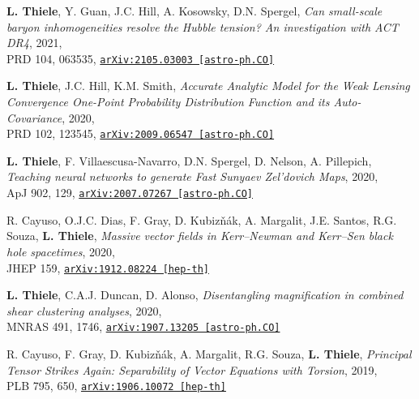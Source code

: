 \begin{minipage}{\textwidth}
{\bf L. Thiele}, Y. Guan, J.C. Hill, A. Kosowsky, D.N. Spergel,
\emph{Can small-scale baryon inhomogeneities resolve the Hubble tension? An investigation with ACT DR4}, 2021,\\
PRD 104, 063535,
\href{https://arxiv.org/abs/2105.03003}{\mbox{\texttt{arXiv:2105.03003 [astro-ph.CO]}}}
\end{minipage}

\begin{minipage}{\textwidth}
{\bf L. Thiele}, J.C. Hill, K.M. Smith,
\emph{Accurate Analytic Model for the Weak Lensing Convergence One-Point Probability Distribution Function and its Auto-Covariance}, 2020,\\
PRD 102, 123545,
\href{https://arxiv.org/abs/2009.06547}{\mbox{\texttt{arXiv:2009.06547 [astro-ph.CO]}}}
\end{minipage}

\begin{minipage}{\textwidth}
{\bf L. Thiele}, F. Villaescusa-Navarro, D.N. Spergel, D. Nelson, A. Pillepich,
\emph{Teaching neural networks to generate Fast Sunyaev Zel'dovich Maps}, 2020,\\
ApJ 902, 129,
\href{https://arxiv.org/abs/2007.07267}{\mbox{\texttt{arXiv:2007.07267 [astro-ph.CO]}}}
\end{minipage}

\begin{minipage}{\textwidth}
R. Cayuso, O.J.C. Dias, F. Gray, D. Kubiz\v{n}\'{a}k, A. Margalit, J.E. Santos, R.G. Souza, {\bf L. Thiele},
\emph{Massive vector fields in Kerr--Newman and Kerr--Sen black hole spacetimes}, 2020,\\
JHEP 159,
\href{https://arxiv.org/abs/1912.08224}{\mbox{\texttt{arXiv:1912.08224 [hep-th]}}}
\end{minipage}

\begin{minipage}{\textwidth}
{\bf L. Thiele}, C.A.J. Duncan, D. Alonso,
\emph{Disentangling magnification in combined shear clustering analyses}, 2020,\\
MNRAS 491, 1746,
\href{https://arxiv.org/abs/1907.13205}{\mbox{\texttt{arXiv:1907.13205 [astro-ph.CO]}}}
\end{minipage}

\begin{minipage}{\textwidth}
R. Cayuso, F. Gray, D. Kubiz\v{n}\'{a}k, A. Margalit, R.G. Souza, {\bf L. Thiele},
\emph{Principal Tensor Strikes Again: Separability of Vector Equations with Torsion}, 2019,\\
PLB 795, 650,
\href{https://arxiv.org/abs/1906.10072}{\mbox{\texttt{arXiv:1906.10072 [hep-th]}}}
\end{minipage}

